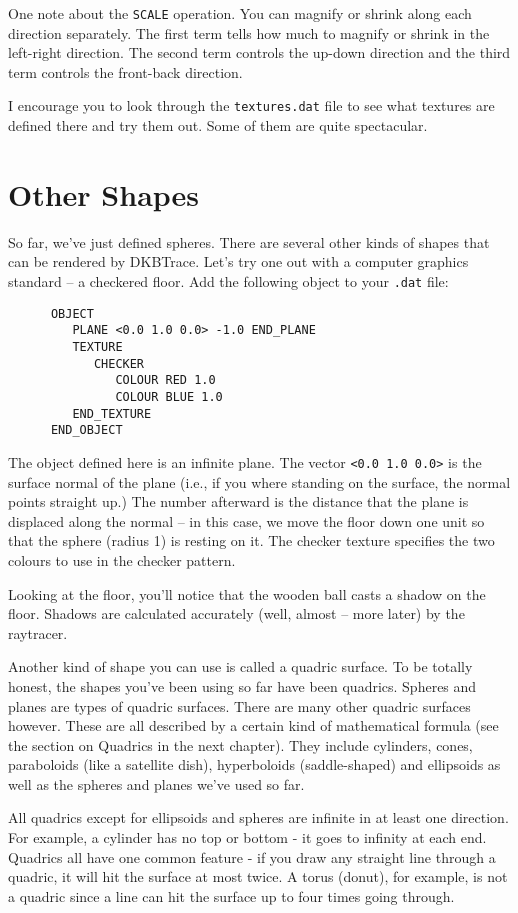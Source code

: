 One note about the {\tt SCALE} operation.  You can
magnify or shrink
along each direction separately.  The first term tells how much to
magnify or shrink in the left-right direction.  The second term
controls the up-down direction and the third term controls the
front-back direction.

I encourage you to look through the {\tt textures.dat} file to see
what textures are defined there and try them out.  Some of them are
quite spectacular.

\section{Other Shapes}

So far, we've just defined spheres.  There are several other kinds of
shapes that can be rendered by DKBTrace.  Let's try one out with a
computer graphics standard -- a checkered floor.  Add the following
object to your {\tt .dat} file:
\begin{verbatim}
      OBJECT
         PLANE <0.0 1.0 0.0> -1.0 END_PLANE
         TEXTURE
            CHECKER
               COLOUR RED 1.0
               COLOUR BLUE 1.0
         END_TEXTURE
      END_OBJECT
\end{verbatim}
The object defined here is an infinite plane.  The vector
{\tt <0.0 1.0 0.0>} is the surface normal of the plane (i.e., if you where
standing on the surface, the normal points straight up.)  The number
afterward is the distance that the plane is displaced along the normal
-- in this case, we move the floor down one unit so that the sphere
(radius 1) is resting on it.  The checker texture specifies the two
colours to use in the checker pattern.

Looking at the floor, you'll notice that the wooden ball casts a shadow on the
floor.  Shadows are calculated accurately (well, almost -- more later) by the
raytracer.

Another kind of shape you can use is called a quadric surface.  To be totally
honest, the shapes you've been using so far have been quadrics.  Spheres and
planes are types of quadric surfaces.  There are many other quadric surfaces
however.  These are all described by a certain kind of mathematical formula
(see the section on Quadrics in the next chapter).  They include cylinders,
cones, paraboloids (like a satellite dish), hyperboloids (saddle-shaped) and
ellipsoids as well as the spheres and planes we've used so far.

All quadrics except for ellipsoids and spheres are infinite in at least one
direction.  For example, a cylinder has no top or bottom - it goes to infinity
at each end.  Quadrics all have one common feature - if you draw any straight
line through a quadric, it will hit the surface at most twice.  A torus
(donut), for example, is not a quadric since a line can hit the surface up to
four times going through.

